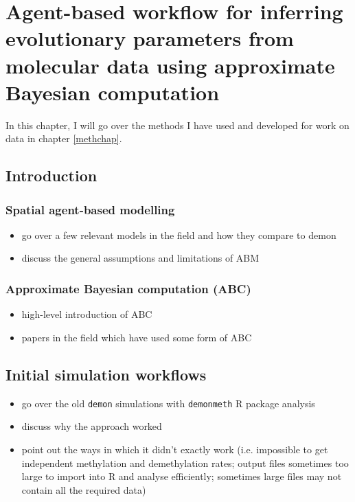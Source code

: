 \chapter{Agent-based workflow for inferring evolutionary parameters from molecular data using approximate Bayesian computation}\label{demonchap}
In this chapter, I will go over the methods I have used and developed for work on data in chapter \ref{methchap}. 

\section{Introduction}
\subsection{Spatial agent-based modelling}
\begin{itemize}
    \item go over a few relevant models in the field and how they compare to demon
    \item discuss the general assumptions and limitations of ABM
\end{itemize}


\subsection{Approximate Bayesian computation (ABC)}
\begin{itemize}
    \item high-level introduction of ABC
    \item papers in the field which have used some form of ABC
\end{itemize}

\section{Initial simulation workflows}
\begin{itemize}
    \item go over the old \texttt{demon} simulations with \texttt{demonmeth} R package analysis
    \item discuss why the approach worked
    \item point out the ways in which it didn't exactly work (i.e. impossible to get independent methylation and demethylation rates; output files sometimes too large to import into R and analyse efficiently; sometimes large files may not contain all the required data)
\end{itemize}

